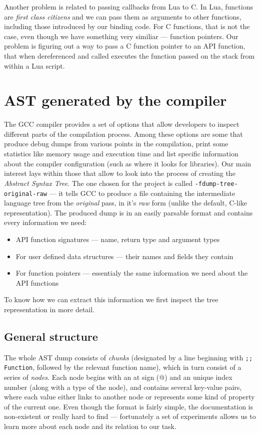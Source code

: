 \documentclass[polish, english]{iithesis}
\begin{document}
    Another problem is related to passing callbacks from Lua to C.
    In Lua, functions are \textit{first class citizens} and we can pass them as arguments to other functions, including those introduced by our binding code.
    For C functions, that is not the case, even though we have something very similiar --- function pointers.
    Our problem is figuring out a way to pass a C function pointer to an API function, that when dereferenced and called executes the function passed on the stack from within a Lua script.

\chapter{AST generated by the compiler}
The GCC compiler provides a set of options that allow developers to inspect different parts of the compilation process.
Among these options are some that produce debug dumps from various points in the compilation, print some statistics like memory usage and execution time and list specific information about the compiler configuration (such as where it looks for libraries).
Our main interest lays within those that allow to look into the process of creating the \textit{Abstract Syntax Tree}.
The one chosen for the project is called \texttt{-fdump-tree-original-raw} --- it tells GCC to produce a file containing the intermediate language tree from the \textit{original} pass, in it's \textit{raw} form (unlike the default, C-like representation). 
The produced dump is in an easily parsable format and contains every information we need:
\begin{itemize}
  \item API function signatures --- name, return type and argument types 
  \item For user defined data structures --- their names and fields they contain 
  \item For function pointers --- essentialy the same information we need about the API functions
\end{itemize}
To know how we can extract this information we first inspect the tree representation in more detail.
  \section{General structure}
The whole AST dump consists of \textit{chunks} (designated by a line beginning with \texttt{;; Function}, followed by the relevant function name), which in turn consist of a series of \textit{nodes}.
Each node begins with an at sign (@) and an unique index number (along with a type of the node), and contains several key-value pairs, where each value either links to another node or represents some kind of property of the current one.
Even though the format is fairly simple, the documentation is non-existent or really hard to find --- fortunately a set of experiments allows us to learn more about each node and its relation to our task. 
\end{document}
